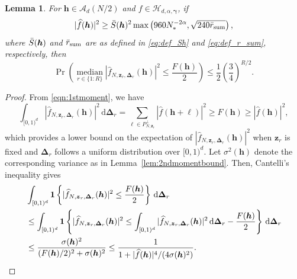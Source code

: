 \documentclass[a4paper,11pt]{article}
\newtheorem{lemma}[theorem]{Lemma}
\newcommand{\rd}{\, \mathrm{d}}
\newcommand{\bsh}{\boldsymbol{h}}
\newcommand{\bsl}{\boldsymbol{\ell}}
\newcommand{\bsz}{\boldsymbol{z}}
\newcommand{\bsgamma}{\boldsymbol{\gamma}}
\newcommand{\bsDelta}{\boldsymbol{\Delta}}
\newcommand{\Hcal}{\mathcal{H}}
\newcommand{\bsone}{\boldsymbol{1}}
\begin{document}
\begin{lemma}\label{thm:inKN}
For  $\bsh\in \mathcal{A}_d(N/2)$ and $f\in \Hcal_{d,\alpha,\bsgamma}$, if 
    \begin{equation}\label{eqn:largefhat}
       |\widehat{f}(\bsh)|^2\ge \Bar{S}(\bsh)^2\max\left(960 N^{-2\alpha}_*,\sqrt{240 \Bar{r}_{\mathrm{sum}} }\right),
    \end{equation}
    where $\Bar{S}(\bsh)$ and $\Bar{r}_{\mathrm{sum}}$ are as defined in \eqref{eq:def_Sh} and \eqref{eq:def_r_sum}, respectively, then 
    \[
    \Pr\left(\operatorname*{median}_{r\in\{1{:}R\}} | \widehat{f}_{N,\bsz_r,\bsDelta_r}(\bsh)|^2\leq \frac{F(\bsh)}{2}\right)\le \frac{1}{2}\left(\frac{3}{4}\right)^{R/2}.
    \]
\end{lemma}
\begin{proof}
From \eqref{eqn:1stmoment}, we have
\[
\int_{[0,1)^d}|\widehat{f}_{N,\bsz_r,\bsDelta_r}(\bsh)|^2\rd\bsDelta_r=\sum_{\bsl \in P_{N,\boldsymbol{z}_r}^\perp}|\widehat{f}(\bsh+\bsl)|^2\geq F(\bsh)\geq |\widehat{f}(\bsh)|^2,
\]
which provides a lower bound on the expectation of $|\widehat{f}_{N,\bsz_r,\bsDelta_r}(\bsh)|^2$ when $\bsz_r$ is fixed and $\bsDelta_r$ follows a uniform distribution over $[0,1)^d$. 
Let $\sigma^2(\bsh)$ denote the corresponding variance as in Lemma~\ref{lem:2ndmomentbound}. 
Then, Cantelli's inequality gives
\begin{align}\label{eqn:Cantelli}
     & \int_{[0,1)^d}\bsone\left\{|\widehat{f}_{N,\bsz_r,\bsDelta_r}(\bsh)|^2\leq \frac{F(\bsh)}{2}\right\}\rd\bsDelta_r \notag\\
     & \le \int_{[0,1)^d}\bsone\left\{|\widehat{f}_{N,\bsz_r,\bsDelta_r}(\bsh)|^2\leq\int_{[0,1)^d} |\widehat{f}_{N,\bsz_r,\bsDelta_r}(\bsh)|^2\rd\bsDelta_r - \frac{F(\bsh)}{2}\right\}\rd\bsDelta_r \notag\\
    & \le \frac{\sigma(\bsh)^2}{(F(\bsh)/2)^2+\sigma(\bsh)^2} \le \frac{1}{1+|\widehat{f}(\bsh)|^4/(4\sigma(\bsh)^2)}.    
\end{align}


\end{proof}
\end{document}
